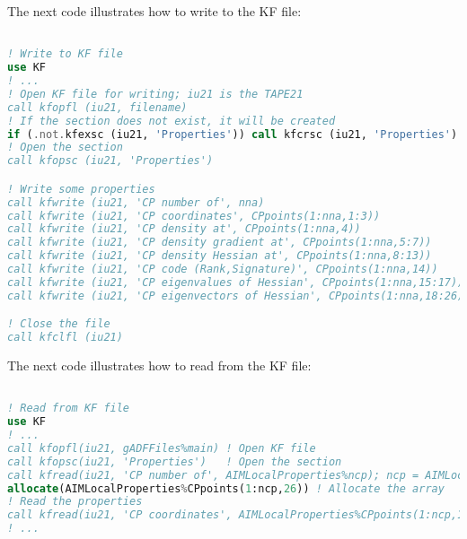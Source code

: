 \newpage
The next code illustrates how to write to the KF file:

\begin{lstlisting}[language=fortran]

! Write to KF file
use KF
! ...
! Open KF file for writing; iu21 is the TAPE21
call kfopfl (iu21, filename) 
! If the section does not exist, it will be created
if (.not.kfexsc (iu21, 'Properties')) call kfcrsc (iu21, 'Properties')
! Open the section
call kfopsc (iu21, 'Properties')

! Write some properties
call kfwrite (iu21, 'CP number of', nna)
call kfwrite (iu21, 'CP coordinates', CPpoints(1:nna,1:3))
call kfwrite (iu21, 'CP density at', CPpoints(1:nna,4))
call kfwrite (iu21, 'CP density gradient at', CPpoints(1:nna,5:7))
call kfwrite (iu21, 'CP density Hessian at', CPpoints(1:nna,8:13))
call kfwrite (iu21, 'CP code (Rank,Signature)', CPpoints(1:nna,14))
call kfwrite (iu21, 'CP eigenvalues of Hessian', CPpoints(1:nna,15:17))
call kfwrite (iu21, 'CP eigenvectors of Hessian', CPpoints(1:nna,18:26))

! Close the file
call kfclfl (iu21)
\end{lstlisting}

The next code illustrates how to read from the KF file:
\begin{lstlisting}[language=fortran]

! Read from KF file
use KF
! ...
call kfopfl(iu21, gADFFiles%main) ! Open KF file
call kfopsc(iu21, 'Properties')   ! Open the section
call kfread(iu21, 'CP number of', AIMLocalProperties%ncp); ncp = AIMLocalProperties%ncp                                          
allocate(AIMLocalProperties%CPpoints(1:ncp,26)) ! Allocate the array
! Read the properties
call kfread(iu21, 'CP coordinates', AIMLocalProperties%CPpoints(1:ncp,1:3))                                                      
! ...

\end{lstlisting}

